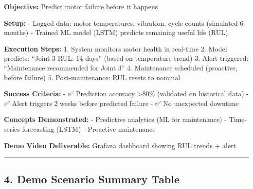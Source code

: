 \documentclass[
]{article}
\begin{document}
\textbf{Objective:} Predict motor failure before it happens

\textbf{Setup:} - Logged data: motor temperatures, vibration, cycle
counts (simulated 6 months) - Trained ML model (LSTM) predicts remaining
useful life (RUL)

\textbf{Execution Steps:} 1. System monitors motor health in real-time
2. Model predicts: ``Joint 3 RUL: 14 days'' (based on temperature trend)
3. Alert triggered: ``Maintenance recommended for Joint 3'' 4.
Maintenance scheduled (proactive, before failure) 5. Post-maintenance:
RUL resets to nominal

\textbf{Success Criteria:} - ✅ Prediction accuracy \textgreater80\%
(validated on historical data) - ✅ Alert triggers 2 weeks before
predicted failure - ✅ No unexpected downtime

\textbf{Concepts Demonstrated:} - Predictive analytics (ML for
maintenance) - Time-series forecasting (LSTM) - Proactive maintenance

\textbf{Demo Video Deliverable:} Grafana dashboard showing RUL trends +
alert

\begin{center}\rule{0.5\linewidth}{0.5pt}\end{center}

\hypertarget{demo-scenario-summary-table}{%
\subsection{4. Demo Scenario Summary
Table}\label{demo-scenario-summary-table}}
\end{document}
